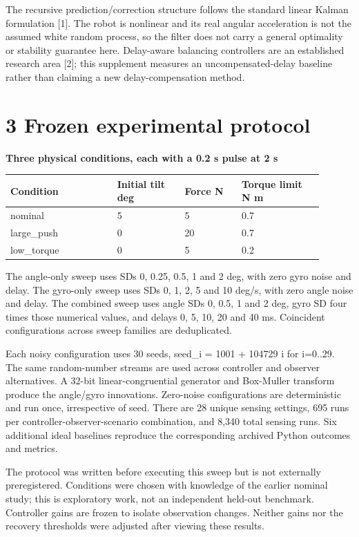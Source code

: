 \documentclass[11pt,a4paper]{article}
\begin{document}
The recursive prediction/correction structure follows the standard linear Kalman formulation [1]. The robot is nonlinear and its real angular acceleration is not the assumed white random process, so the filter does not carry a general optimality or stability guarantee here. Delay-aware balancing controllers are an established research area [2]; this supplement measures an uncompensated-delay baseline rather than claiming a new delay-compensation method.

\section*{3 Frozen experimental protocol}
\textbf{Three physical conditions, each with a 0.2 s pulse at 2 s}
\begin{longtable}{p{0.306\linewidth}p{0.198\linewidth}p{0.162\linewidth}p{0.234\linewidth}}
\toprule
Condition & Initial tilt deg & Force N & Torque limit N m \\ \midrule \endhead
nominal & 5 & 5 & 0.7 \\
large\_push & 0 & 20 & 0.7 \\
low\_torque & 0 & 5 & 0.2 \\
\bottomrule
\end{longtable}
The angle-only sweep uses SDs 0, 0.25, 0.5, 1 and 2 deg, with zero gyro noise and delay. The gyro-only sweep uses SDs 0, 1, 2, 5 and 10 deg/s, with zero angle noise and delay. The combined sweep uses angle SDs 0, 0.5, 1 and 2 deg, gyro SD four times those numerical values, and delays 0, 5, 10, 20 and 40 ms. Coincident configurations across sweep families are deduplicated.

Each noisy configuration uses 30 seeds, seed\_i = 1001 + 104729 i for i=0..29. The same random-number streams are used across controller and observer alternatives. A 32-bit linear-congruential generator and Box-Muller transform produce the angle/gyro innovations. Zero-noise configurations are deterministic and run once, irrespective of seed. There are 28 unique sensing settings, 695 runs per controller-observer-scenario combination, and 8,340 total sensing runs. Six additional ideal baselines reproduce the corresponding archived Python outcomes and metrics.

The protocol was written before executing this sweep but is not externally preregistered. Conditions were chosen with knowledge of the earlier nominal study; this is exploratory work, not an independent held-out benchmark. Controller gains are frozen to isolate observation changes. Neither gains nor the recovery thresholds were adjusted after viewing these results.
\end{document}
